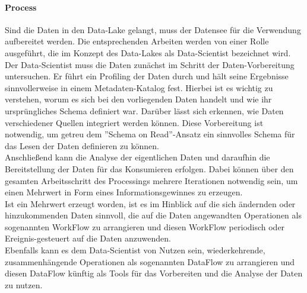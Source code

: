 \documentclass[twoside,twocolumn]{article}
\begin{document}
\paragraph{Process}
		Sind die Daten in den Data-Lake gelangt, muss der Datensee für die Verwendung aufbereitet werden. Die entsprechenden Arbeiten werden von einer Rolle ausgeführt, die im Konzept des Data-Lakes als Data-Scientist bezeichnet wird.
		Der Data-Scientist muss die Daten zunächst im Schritt der Daten-Vorbereitung  untersuchen. Er führt ein Profiling der Daten durch und hält seine Ergebnisse sinnvollerweise in einem Metadaten-Katalog fest. Hierbei ist es wichtig zu verstehen, worum es sich bei den vorliegenden Daten handelt und wie ihr ursprüngliches Schema definiert  war. Darüber lässt sich erkennen, wie Daten verschiedener Quellen integriert werden können. Diese Vorbereitung ist notwendig, um getreu dem ''Schema on Read''-Ansatz ein sinnvolles Schema für das Lesen der Daten definieren zu können.\\
		Anschließend kann die Analyse der eigentlichen Daten und daraufhin die Bereitstellung der Daten für das Konsumieren erfolgen. Dabei können über den gesamten Arbeitsschritt des Processings mehrere Iterationen notwendig sein, um einen Mehrwert in Form eines Informationsgewinnes zu erzeugen.\\
		Ist ein Mehrwert erzeugt worden, ist es im Hinblick auf die sich ändernden oder hinzukommenden Daten sinnvoll, die auf die Daten angewandten Operationen als sogenannten WorkFlow zu arrangieren und diesen WorkFlow periodisch oder Ereignis-gesteuert auf die Daten anzuwenden.\\
		Ebenfalls kann es dem Data-Scientist von Nutzen sein, wiederkehrende, zusammenhängende Operationen als sogenannten DataFlow zu arrangieren und diesen DataFlow künftig als Tools für das Vorbereiten und die Analyse der Daten zu nutzen.\\
		\cite{src8}\cite{src12}
		
\end{document}
